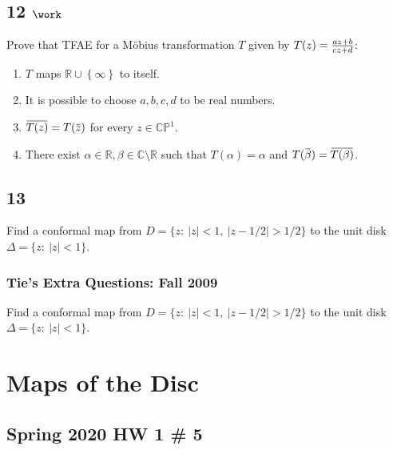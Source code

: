 \hypertarget{work-63}{%
\subsection{\texorpdfstring{12
\(\work\)}{12 \textbackslash work}}\label{work-63}}

Prove that TFAE for a Möbius transformation \(T\) given by
\(T(z) = {az + b \over cz + d}\):

\begin{enumerate}
\def\labelenumi{\alph{enumi}.}
\tightlist
\item
  \(T\) maps \({\mathbb{R}}\cup\left\{{\infty}\right\}\) to itself.
\item
  It is possible to choose \(a,b,c,d\) to be real numbers.
\item
  \(\mkern 1.5mu\overline{\mkern-1.5muT(z)\mkern-1.5mu}\mkern 1.5mu = T(\mkern 1.5mu\overline{\mkern-1.5muz\mkern-1.5mu}\mkern 1.5mu)\)
  for every \(z\in {\mathbb{CP}}^1\).
\item
  There exist
  \(\alpha\in {\mathbb{R}}, \beta \in {\mathbb{C}}\setminus {\mathbb{R}}\)
  such that \(T(\alpha) = \alpha\) and
  \(T(\mkern 1.5mu\overline{\mkern-1.5mu\beta\mkern-1.5mu}\mkern 1.5mu) = \mkern 1.5mu\overline{\mkern-1.5muT(\beta)\mkern-1.5mu}\mkern 1.5mu\).
\end{enumerate}

\hypertarget{section-3}{%
\subsection{13}\label{section-3}}

Find a conformal map from \(D = \{z :\  |z| < 1,\ |z - 1/2| > 1/2\}\) to
the unit disk \(\Delta=\{z: \ |z|<1\}\).

\hypertarget{ties-extra-questions-fall-2009-8}{%
\subsubsection{Tie's Extra Questions: Fall
2009}\label{ties-extra-questions-fall-2009-8}}

Find a conformal map from \(D = \{z :\  |z| < 1,\ |z - 1/2| > 1/2\}\) to
the unit disk \(\Delta=\{z: \ |z|<1\}\).

\hypertarget{maps-of-the-disc}{%
\section{Maps of the Disc}\label{maps-of-the-disc}}

\hypertarget{spring-2020-hw-1-5-1}{%
\subsection{Spring 2020 HW 1 \# 5}\label{spring-2020-hw-1-5-1}}

